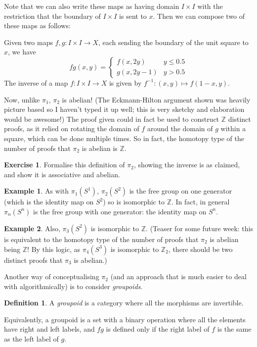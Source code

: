 \documentclass[a4paper,12pt]{article}
\newcommand{\ZZ}{\mathbb{Z}}
\newcommand{\ZZ}{\mathbb{Z}}
\theoremstyle{definition}
\newtheorem*{defn}{Definition}
\newtheorem*{exer}{Exercise}
\newtheorem*{example}{Example}
\begin{document}
Note that we can also write these maps as having domain $I\times I$ with the restriction that the boundary of $I\times I$ is sent to $x$.
Then we can compose two of these maps as follows:

Given two maps $f, g: I\times I\to X$, each sending the boundary of the unit square to $x$, we have
$$fg(x, y) = \begin{cases}
		f(x, 2y) & y\leq 0.5\\
		g(x, 2y-1) & y > 0.5
	\end{cases}$$
The inverse of a map $f: I\times I\to X$ is given by $f^{-1}: (x, y)\mapsto f(1-x, y)$.

Now, unlike $\pi_1$, $\pi_2$ is abelian!
(The Eckmann-Hilton argument shown was heavily picture based so I haven't typed it up well; this is very sketchy and elaboration would be awesome!)
The proof given could in fact be used to construct $\ZZ$ distinct proofs, as it relied on rotating the domain of $f$ around the domain of $g$ within a square, which can be done multiple times.
So in fact, the homotopy type of the number of proofs that $\pi_2$ is abelian is $\ZZ$.

\begin{exer}
Formalise this definition of $\pi_2$, showing the inverse is as claimed, and show it is associative and abelian.
\end{exer}

\begin{example}
As with $\pi_1(S^1)$, $\pi_2(S^2)$ is the free group on one generator (which is the identity map on $S^2$) so is isomorphic to $\ZZ$.
In fact, in general $\pi_n(S^n)$ is the free group with one generator: the identity map on $S^n$.
\end{example}

\begin{example}
Also, $\pi_3(S^2)$ is isomorphic to $\ZZ$.
(Teaser for some future week: this is equivalent to the homotopy type of the number of proofs that $\pi_2$ is abelian being $\ZZ$! By this logic, as $\pi_4(S^3)$ is isomorphic to $\ZZ_2$, there should be two distinct proofs that $\pi_3$ is abelian.)
\end{example}

Another way of conceptualising $\pi_2$ (and an approach that is much easier to deal with algorithmically) is to consider \emph{groupoids}.

\begin{defn}
A \emph{groupoid} is a category where all the morphisms are invertible.

Equivalently, a groupoid is a set with a binary operation where all the elements have right and left labels, and $fg$ is defined only if the right label of $f$ is the same as the left label of $g$.
\end{defn}
\end{document}
